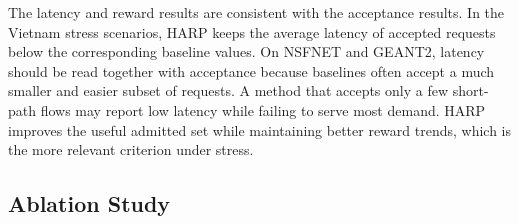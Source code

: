 \documentclass[final,5p]{elsarticle}
\begin{document}






The latency and reward results are consistent with the acceptance results. In the Vietnam stress scenarios, HARP keeps the average latency of accepted requests below the corresponding baseline values. On NSFNET and GEANT2, latency should be read together with acceptance because baselines often accept a much smaller and easier subset of requests. A method that accepts only a few short-path flows may report low latency while failing to serve most demand. HARP improves the useful admitted set while maintaining better reward trends, which is the more relevant criterion under stress.

    \subsection{Ablation Study}
\label{subsec:ablation_study}
\end{document}
